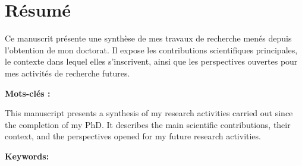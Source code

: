 
\chapter*{Résumé}

\begin{hdrabstract}[Résumé]

Ce manuscrit présente une synthèse de mes travaux de recherche menés depuis l'obtention de
mon doctorat. Il expose les contributions scientifiques principales, le contexte dans lequel
elles s'inscrivent, ainsi que les perspectives ouvertes pour mes activités de recherche futures.

\medskip
\textbf{Mots-clés :} 
\end{hdrabstract}

\bigskip

\begin{hdrabstract}[Abstract]

This manuscript presents a synthesis of my research activities carried out since the
completion of my PhD. It describes the main scientific contributions, their context,
and the perspectives opened for my future research activities.

\medskip
\textbf{Keywords:} 
\end{hdrabstract}
